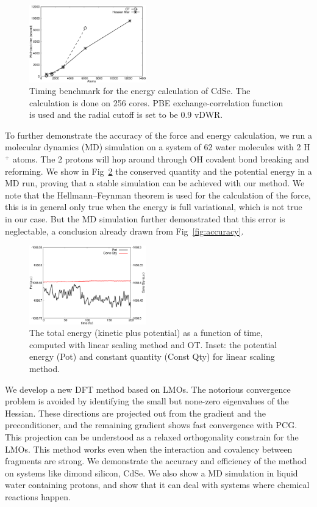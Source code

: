 \documentclass[aps,prl,twocolumn,reprint,amsmath,amssymb]{revtex4-1}
\begin{document}
\begin{figure}
\includegraphics[width=0.45\textwidth]{timing}
\caption{Timing benchmark for the energy calculation of CdSe. The calculation is done on 256 cores. PBE exchange-correlation function is used and the radial cutoff is set to be 0.9 vDWR.}
\label{fig:scaling}
\end{figure}


\label{marker:moldyn}To further demonstrate the accuracy of the force and energy calculation, we run a molecular dynamics (MD) simulation on a system of 62 water molecules with 2 H$^+$ atoms. The 2 protons will hop around through OH covalent bond breaking and reforming. We show in Fig~\ref{fig:md} the conserved quantity and the potential energy in a MD run, proving that a stable simulation can be achieved with our method. We note that the Hellmann–Feynman theorem\cite{feynman1939forces} is used for the calculation of the force, this is in general only true when the energy is full variational, which is not true in our case. But the MD simulation further demonstrated that this error is neglectable, a conclusion already drawn from Fig~\ref{fig:accuracy}.

\begin{figure}
\includegraphics[width=0.45\textwidth]{const}
\caption{The total energy (kinetic plus potential) as a function of time, computed with linear scaling method and OT. Inset: the potential energy (Pot) and constant quantity (Const Qty) for linear scaling method.}
\label{fig:md}
\end{figure}


\label{marker:conclusion} We develop a new DFT method based on LMOs. The notorious convergence problem is avoided by identifying the small but none-zero eigenvalues of the Hessian. These directions are projected out from the gradient and the preconditioner, and the remaining gradient shows fast convergence with PCG. This projection can be understood as a relaxed orthogonality constrain for the LMOs. This method works even when the interaction and covalency between fragments are strong. We demonstrate the accuracy and efficiency of the method on systems like dimond silicon, CdSe. We also show a MD simulation in liquid water containing protons, and show that it can deal with systems where chemical reactions happen.
\end{document}
